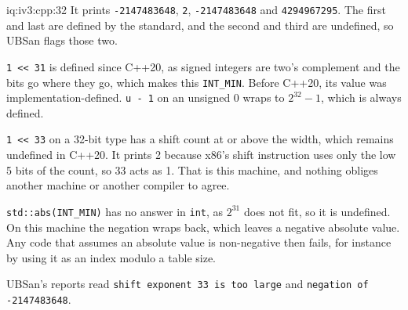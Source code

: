 \begin{solution}{iq:iv3:cpp:32}
It prints \texttt{-2147483648}, \texttt{2}, \texttt{-2147483648} and \texttt{4294967295}. The first and last are defined by the standard, and the second and third are undefined, so UBSan flags those two.

\texttt{1 <{}< 31} is defined since C++20, as signed integers are two's complement and the bits go where they go, which makes this \texttt{INT\_MIN}. Before C++20, its value was implementation-defined. \texttt{u - 1} on an unsigned 0 wraps to $2^{32} - 1$, which is always defined.

\texttt{1 <{}< 33} on a 32-bit type has a shift count at or above the width, which remains undefined in C++20. It prints 2 because x86's shift instruction uses only the low 5 bits of the count, so 33 acts as 1. That is this machine, and nothing obliges another machine or another compiler to agree.

\texttt{std::abs(INT\_MIN)} has no answer in \texttt{int}, as $2^{31}$ does not fit, so it is undefined. On this machine the negation wraps back, which leaves a negative absolute value. Any code that assumes an absolute value is non-negative then fails, for instance by using it as an index modulo a table size.

UBSan's reports read \texttt{shift exponent 33 is too large} and \texttt{negation of -2147483648}.

\end{solution}

